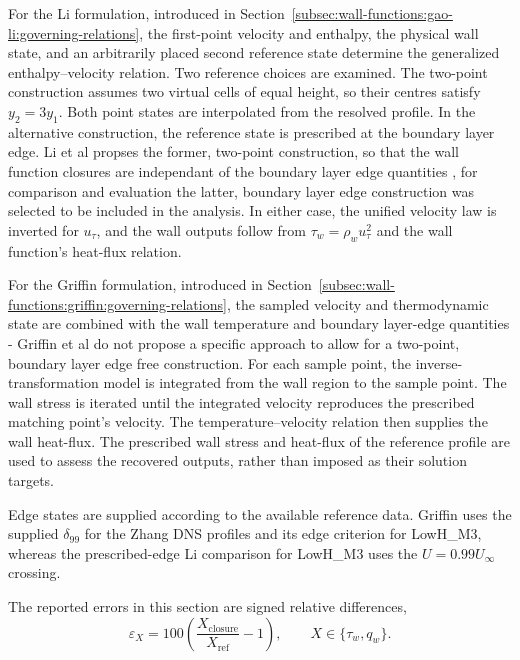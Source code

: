 For the Li formulation, introduced in Section~\ref{subsec:wall-functions:gao-li:governing-relations}, the first-point velocity and enthalpy, the physical wall state, and an arbitrarily placed second reference state determine the generalized enthalpy--velocity relation. Two reference choices are examined. The two-point construction assumes two virtual cells of equal height, so their centres satisfy \(y_2=3y_1\). Both point states are interpolated from the resolved profile. In the alternative construction, the reference state is prescribed at the boundary layer edge. Li et al propses the former, two-point construction, so that the wall function closures are independant of the boundary layer edge quantities \cite{li2025WF}, for comparison and evaluation the latter, boundary layer edge construction was selected to be included in the analysis. In either case, the unified velocity law is inverted for \(u_\tau\), and the wall outputs follow from \(\tau_w=\rho_wu_\tau^2\) and the wall function's heat-flux relation.
\par\medskip

For the Griffin formulation, introduced in Section~\ref{subsec:wall-functions:griffin:governing-relations}, the sampled velocity and thermodynamic state are combined with the wall temperature and boundary layer-edge quantities - Griffin et al do not propose a specific approach to allow for a two-point, boundary layer edge free construction. For each sample point, the inverse-transformation model is integrated from the wall region to the sample point. The wall stress is iterated until the integrated velocity reproduces the prescribed matching point's velocity. The temperature--velocity relation then supplies the wall heat-flux. The prescribed wall stress and heat-flux of the reference profile are used to assess the recovered outputs, rather than imposed as their solution targets.
\par\medskip

Edge states are supplied according to the available reference data. Griffin uses the supplied \(\delta_{99}\) for the Zhang DNS profiles and its edge criterion for LowH\_M3, whereas the prescribed-edge Li comparison for LowH\_M3 uses the \(U=0.99U_\infty\) crossing.
\par\medskip

The reported errors in this section are signed relative differences,
\begin{equation}
    \varepsilon_X
    = 100\left(\frac{X_{\mathrm{closure}}}{X_{\mathrm{ref}}}-1\right),
    \qquad X\in\{\tau_w,q_w\}.
    \label{eq:erriso:apriori-relative-error}
\end{equation}

